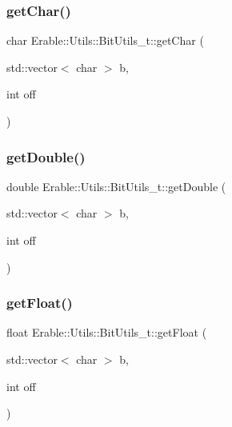 \subsubsection{\texorpdfstring{getChar()}{getChar()}}
{\footnotesize\ttfamily char Erable\+::\+Utils\+::\+Bit\+Utils\+\_\+t\+::get\+Char (\begin{DoxyParamCaption}\item[{std\+::vector$<$ char $>$}]{b,  }\item[{int}]{off }\end{DoxyParamCaption})\hspace{0.3cm}{\ttfamily [inline]}}

\mbox{\label{class_erable_1_1_utils_1_1_bit_utils__t_aa402b5136a5819451891e8d55b8b8d2d}} 
\subsubsection{\texorpdfstring{getDouble()}{getDouble()}}
{\footnotesize\ttfamily double Erable\+::\+Utils\+::\+Bit\+Utils\+\_\+t\+::get\+Double (\begin{DoxyParamCaption}\item[{std\+::vector$<$ char $>$}]{b,  }\item[{int}]{off }\end{DoxyParamCaption})\hspace{0.3cm}{\ttfamily [inline]}}

\mbox{\label{class_erable_1_1_utils_1_1_bit_utils__t_ac2b25328cbf57f2721d13b1412c3642b}} 
\subsubsection{\texorpdfstring{getFloat()}{getFloat()}}
{\footnotesize\ttfamily float Erable\+::\+Utils\+::\+Bit\+Utils\+\_\+t\+::get\+Float (\begin{DoxyParamCaption}\item[{std\+::vector$<$ char $>$}]{b,  }\item[{int}]{off }\end{DoxyParamCaption})\hspace{0.3cm}{\ttfamily [inline]}}

